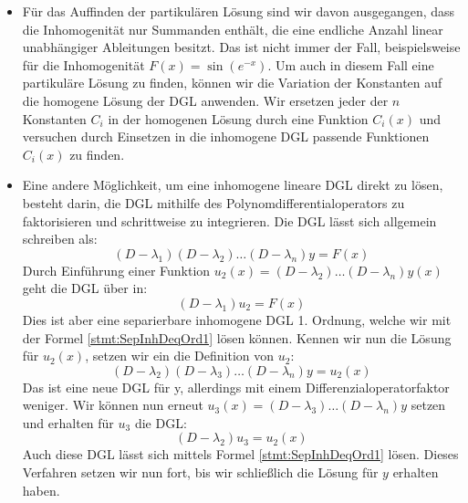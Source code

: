 \begin{itemize}
    \item Für das Auffinden der partikulären Lösung sind wir davon ausgegangen, dass die Inhomogenität nur Summanden enthält, die eine endliche Anzahl linear unabhängiger Ableitungen besitzt. Das ist nicht immer der Fall, beispielsweise für die Inhomogenität $F(x) = \sin(e^{-x})$. Um auch in diesem Fall eine partikuläre Lösung zu finden, können wir die Variation der Konstanten auf die homogene Lösung der DGL anwenden. Wir ersetzen jeder der $n$ Konstanten $C_i$ in der homogenen Lösung durch eine Funktion $C_i(x)$ und versuchen durch Einsetzen in die inhomogene DGL passende Funktionen $C_i(x)$ zu finden.
    \item Eine andere Möglichkeit, um eine inhomogene lineare DGL direkt zu lösen, besteht darin, die DGL mithilfe des Polynomdifferentialoperators zu faktorisieren und schrittweise zu integrieren. Die DGL lässt sich allgemein schreiben als:
    $$
        (D-\lambda_1) (D-\lambda_2) \dots (D-\lambda_n) y = F(x)
    $$
    Durch Einführung einer Funktion $u_2(x) = (D-\lambda_2) \dots (D-\lambda_n) y(x)$ geht die DGL über in:
    $$
        (D-\lambda_1) u_2 = F(x)
    $$
    Dies ist aber eine separierbare inhomogene DGL 1. Ordnung, welche wir mit der Formel \ref{stmt:SepInhDeqOrd1} lösen können. Kennen wir nun die Lösung für $u_2(x)$, setzen wir ein die Definition von $u_2$:
    $$
        (D-\lambda_2) (D-\lambda_3) \dots (D-\lambda_n) y = u_2(x)
    $$
    Das ist eine neue DGL für y, allerdings mit einem Differenzialoperatorfaktor weniger. Wir können nun erneut $u_3(x) = (D-\lambda_3) \dots (D-\lambda_n) y$ setzen und erhalten für $u_3$ die DGL:
    $$
        (D-\lambda_2) u_3 = u_2(x)
    $$
    Auch diese DGL lässt sich mittels Formel \ref{stmt:SepInhDeqOrd1} lösen. Dieses Verfahren setzen wir nun fort, bis wir schließlich die Lösung für $y$ erhalten haben.
\end{itemize}


